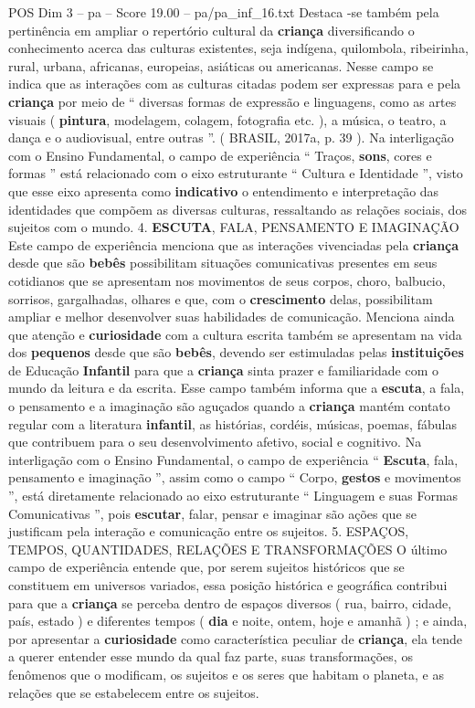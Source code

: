 \begin{textsample}{POS Dim 3 – pa – Score 19.00 – pa/pa\_inf\_16.txt}
Destaca -se também pela pertinência em ampliar o repertório cultural da \textbf{criança} diversificando o conhecimento acerca das culturas existentes, seja indígena, quilombola, ribeirinha, rural, urbana, africanas, europeias, asiáticas ou americanas.
Nesse campo se indica que as interações com as culturas citadas podem ser expressas para e pela \textbf{criança} por meio de “ diversas formas de expressão e linguagens, como as artes visuais ( \textbf{pintura}, modelagem, colagem, fotografia etc. ), a música, o teatro, a dança e o audiovisual, entre outras ”. ( BRASIL, 2017a, p. 39 ).
Na interligação com o Ensino Fundamental, o campo de experiência “ Traços, \textbf{sons}, cores e formas ” está relacionado com o eixo estruturante “ Cultura e Identidade ”, visto que esse eixo apresenta como \textbf{indicativo} o entendimento e interpretação das identidades que compõem as diversas culturas, ressaltando as relações sociais, dos sujeitos com o mundo. 4. \textbf{ESCUTA}, FALA, PENSAMENTO E IMAGINAÇÃO Este campo de experiência menciona que as interações vivenciadas pela \textbf{criança} desde que são \textbf{bebês} possibilitam situações comunicativas presentes em seus cotidianos que se apresentam nos movimentos de seus corpos, choro, balbucio, sorrisos, gargalhadas, olhares e que, com o \textbf{crescimento} delas, possibilitam ampliar e melhor desenvolver suas habilidades de comunicação.
Menciona ainda que atenção e \textbf{curiosidade} com a cultura escrita também se apresentam na vida dos \textbf{pequenos} desde que são \textbf{bebês}, devendo ser estimuladas pelas \textbf{instituições} de Educação \textbf{Infantil} para que a \textbf{criança} sinta prazer e familiaridade com o mundo da leitura e da escrita.
Esse campo também informa que a \textbf{escuta}, a fala, o pensamento e a imaginação são aguçados quando a \textbf{criança} mantém contato regular com a literatura \textbf{infantil}, as histórias, cordéis, músicas, poemas, fábulas que contribuem para o seu desenvolvimento afetivo, social e cognitivo.
Na interligação com o Ensino Fundamental, o campo de experiência “ \textbf{Escuta}, fala, pensamento e imaginação ”, assim como o campo “ Corpo, \textbf{gestos} e movimentos ”, está diretamente relacionado ao eixo estruturante “ Linguagem e suas Formas Comunicativas ”, pois \textbf{escutar}, falar, pensar e imaginar são ações que se justificam pela interação e comunicação entre os sujeitos. 5.
ESPAÇOS, TEMPOS, QUANTIDADES, RELAÇÕES E TRANSFORMAÇÕES O último campo de experiência entende que, por serem sujeitos históricos que se constituem em universos variados, essa posição histórica e geográfica contribui para que a \textbf{criança} se perceba dentro de espaços diversos ( rua, bairro, cidade, país, estado ) e diferentes tempos ( \textbf{dia} e noite, ontem, hoje e amanhã ) ; e ainda, por apresentar a \textbf{curiosidade} como característica peculiar de \textbf{criança}, ela tende a querer entender esse mundo da qual faz parte, suas transformações, os fenômenos que o modificam, os sujeitos e os seres que habitam o planeta, e as relações que se estabelecem entre os sujeitos.

\end{textsample}
